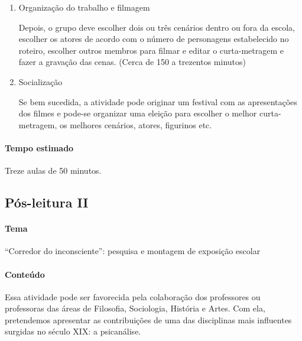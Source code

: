 \documentclass[12pt]{extarticle}
\begin{document}
{\begin{enumerate}
Em seguida, grupos de quatro a seis alunos e alunas realizarão um
curta-metragem mudo de cerca de cinco minutos adaptando o enredo de
\emph{O médico e o monstro}.

A primeira tarefa é escrever um roteiro com as cenas principais que
serão filmadas. O professor ou professora deve apresentar modelos de
redação de roteiro ou solicitar uma pesquisa para os grupos, com
posterior compartilhamento. No site do Instituto de Cinema, há uma
página com instruções. O link para a página é:

https://www.institutodecinema.com.br/mais/conteudo/como-fazer-um-roteiro-de-cinema.

(Cerca de 150 a trezentos minutos)

\item
Organização do trabalho e filmagem

Depois, o grupo deve escolher dois ou três cenários dentro ou fora da
escola, escolher os atores de acordo com o número de personagens
estabelecido no roteiro, escolher outros membros para filmar e editar o
curta-metragem e fazer a gravação das cenas. (Cerca de 150 a trezentos
minutos)

\item
Socialização

Se bem sucedida, a atividade pode originar um festival com as
apresentações dos filmes e pode-se organizar uma eleição para escolher o
melhor curta-metragem, os melhores cenários, atores, figurinos etc.
\end{enumerate}

\paragraph{Tempo estimado} Treze aulas de 50 minutos.

\subsection{Pós-leitura II}

\paragraph{Tema} ``Corredor do inconsciente'': pesquisa e montagem de
exposição escolar


\paragraph{Conteúdo}
Essa atividade pode ser favorecida pela colaboração dos professores ou
professoras das áreas de Filosofia, Sociologia, História e Artes. Com
ela, pretendemos apresentar as contribuições de uma das disciplinas mais
influentes surgidas no século XIX: a psicanálise.

}
\end{document}
